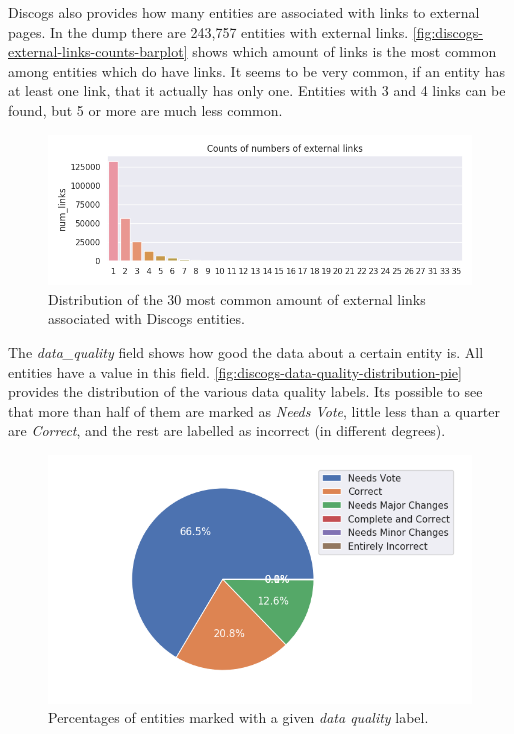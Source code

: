 \documentclass[epsfig,a4paper,11pt,titlepage,twoside,openany]{book}
\begin{document}
Discogs also provides how many entities are associated with links to external pages. In the dump there are 243,757 entities with external links. \autoref{fig:discogs-external-links-counts-barplot} shows which amount of links is the most common among entities which do have links. It seems to be very common, if an entity has at least one link, that it actually has only one. Entities with 3 and 4 links can be found, but 5 or more are much less common.

\begin{figure}[H]
  \centering \includegraphics[width=\textwidth]{discogs_external_links_counts} 
  \caption{Distribution of the 30 most common amount of external links associated with Discogs entities.}
  \label{fig:discogs-external-links-counts-barplot}
\end{figure}

The \textit{data\_quality} field shows how good the data about a certain entity is. All entities have a value in this field. \autoref{fig:discogs-data-quality-distribution-pie} provides the distribution of the various data quality labels. Its possible to see that more than half of them are marked as \textit{Needs Vote}, little less than a quarter are \textit{Correct}, and the rest are labelled as incorrect (in different degrees).

\begin{figure}[H]
  \centering \includegraphics[width=\textwidth]{discogs_data_quality_distribution} 
  \caption{Percentages of entities marked with a given \textit{data quality} label.}
  \label{fig:discogs-data-quality-distribution-pie}
\end{figure}
\end{document}
